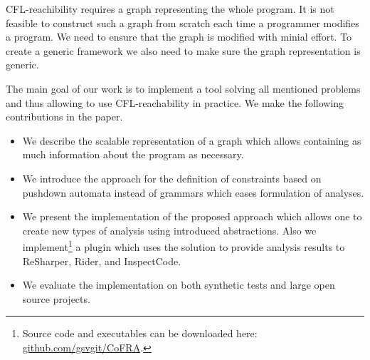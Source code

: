 CFL-reachibility requires a graph representing the whole program.
It is not feasible to construct such a graph from scratch each time a programmer modifies a program.
We need to ensure that the graph is modified with minial effort.
To create a generic framework we also need to make sure the graph representation is generic.

The main goal of our work is to implement a tool solving all mentioned problems and thus allowing to use CFL-reachability in practice.
We make the following contributions in the paper.
\begin{itemize}
	\item We describe the scalable representation of a graph which allows containing as much information about the program as necessary.
	\item We introduce the approach for the definition of constraints based on pushdown automata instead of grammars which eases formulation of analyses.
	\item We present the implementation of the proposed approach which allows one to create new types of analysis using introduced abstractions.
	Also we implement\footnote{Source code and executables can be downloaded here: \url{github.com/gsvgit/CoFRA}.} a plugin which uses the solution to provide analysis results to ReSharper, Rider, and InspectCode.
	\item We evaluate the implementation on both synthetic tests and large open source projects.
\end{itemize}

